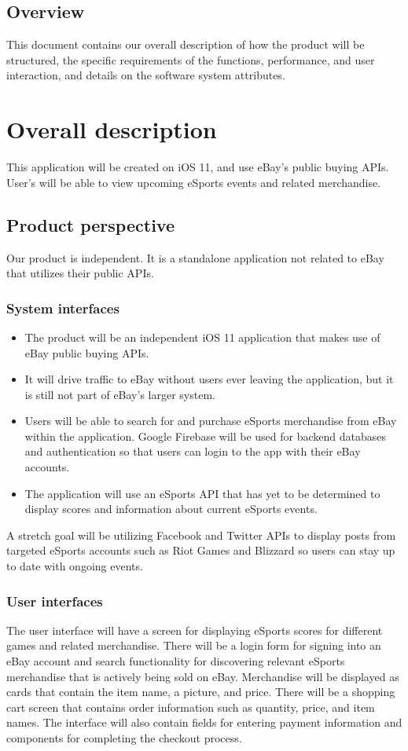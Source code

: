 \documentclass[onecolumn, draftclsnofoot,10pt, compsoc]{IEEEtran}
\begin{document}
\subsection{Overview}
This document contains our overall description of how the product will be structured,  the specific requirements of the functions, performance, and user interaction, and details on the software system attributes.
    
\section{Overall description}
This application will be created on iOS 11, and use eBay's public buying APIs. User's will be able to view upcoming eSports events and related merchandise.

\subsection{Product perspective}
Our product is independent. It is a standalone application not related to eBay that utilizes their public APIs.

\subsubsection{System interfaces}
\begin{itemize}
\item The product will be an independent iOS 11 application that makes use of eBay public buying APIs. 
\item It will drive traffic to eBay without users ever leaving the application, but it is still not part of eBay’s larger system. 
\item Users will be able to search for and purchase eSports merchandise from eBay within the application. 
Google Firebase will be used for backend databases and authentication so that users can login to the app with their eBay accounts. 
\item The application will use an eSports API that has yet to be determined to display scores and information about current eSports events.
\end{itemize}

A stretch goal will be utilizing Facebook and Twitter APIs to display posts from targeted eSports accounts such as Riot Games and Blizzard so users can stay up to date with ongoing events. 
\subsubsection{User interfaces}
The user interface will have a screen for displaying eSports scores for different games and related merchandise. There will be a login form for signing into an eBay account and search functionality for discovering relevant eSports merchandise that is actively being sold on eBay. Merchandise will be displayed as cards that contain the item name, a picture, and price. There will be a shopping cart screen that contains order information such as quantity, price, and item names. The interface will also contain fields for entering payment information and components for completing the checkout process.
\end{document}
